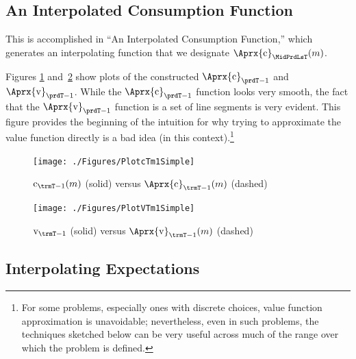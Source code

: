 \documentclass[titlepage, headings=optiontotocandhead]{econtex}
\begin{document}
\hypertarget{an-interpolated-consumption-function}{}
\subsection{An Interpolated Consumption Function} \label{subsec:LinInterp}


This is accomplished in ``An Interpolated Consumption Function,'' which generates an interpolating function that we designate $\Aprx{\mathrm{c}}_{\MidPrdLsT}(m)$. %


Figures \ref{fig:PlotcTm1Simple} and~\ref{fig:PlotVTm1Simple} show
plots of the constructed $\Aprx{\mathrm{c}}_{\prdT-1}$ and $\Aprx{\mathrm{v}}_{\prdT-1}$. While the $\Aprx{\mathrm{c}}_{\prdT-1}$ function looks very smooth, the fact that the $\Aprx{\mathrm{v}}_{\prdT-1}$ function is a set of line segments is very evident.  This figure provides the beginning of the intuition for why trying to approximate the value function directly is a bad idea (in this context).\footnote{For some problems, especially ones with discrete choices, value function approximation is unavoidable; nevertheless, even in such problems, the techniques sketched below can be very useful across much of the range over which the problem is defined.}

\hypertarget{PlotcTm1Simple}{}
\begin{figure}
  \centerline{\texttt{[image: ./Figures/PlotcTm1Simple]}}
  \caption{$\mathrm{c}_{\trmT-1}(m)$ (solid) versus $\Aprx{\mathrm{c}}_{\trmT-1}(m)$ (dashed)}
  \label{fig:PlotcTm1Simple}
\end{figure}

\hypertarget{PlotvTm1Simple}{}
\begin{figure}
  \centerline{\texttt{[image: ./Figures/PlotVTm1Simple]}}
  \caption{$\mathrm{v}_{\trmT-1}$ (solid) versus $\Aprx{\mathrm{v}}_{\trmT-1}(m)$ (dashed)}
  \label{fig:PlotVTm1Simple}
\end{figure}



\hypertarget{interpolating-expectations}{}
\subsection{Interpolating Expectations}
\end{document}
